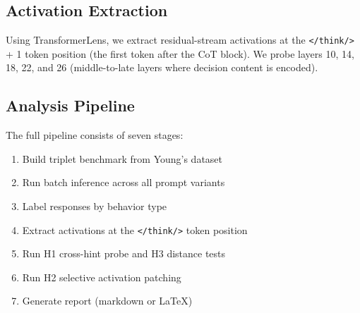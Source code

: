 \subsection{Activation Extraction}
Using TransformerLens, we extract residual-stream activations at the \texttt{</think/>} + 1 token position (the first token after the CoT block). We probe layers \num{10}, \num{14}, \num{18}, \num{22}, and \num{26} (middle-to-late layers where decision content is encoded).

\subsection{Analysis Pipeline}
The full pipeline consists of seven stages:
\begin{enumerate}
    \item Build triplet benchmark from Young's dataset
    \item Run batch inference across all prompt variants
    \item Label responses by behavior type
    \item Extract activations at the \texttt{</think/>} token position
    \item Run H1 cross-hint probe and H3 distance tests
    \item Run H2 selective activation patching
    \item Generate report (markdown or \LaTeX)
\end{enumerate}
